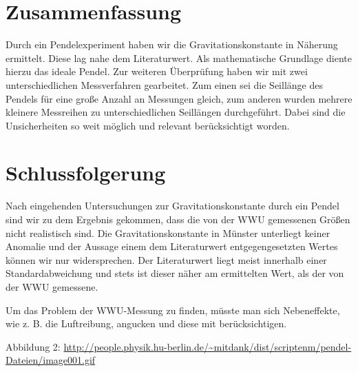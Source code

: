 \documentclass[11pt,a4paper,titlepage, ngerman]{article}
\begin{document}
	\section{Zusammenfassung}
		Durch ein Pendelexperiment haben wir die Gravitationskonstante in Näherung ermittelt.
		Diese lag nahe dem Literaturwert.
		Als mathematische Grundlage diente hierzu das ideale Pendel.
		Zur weiteren Überprüfung haben wir mit zwei unterschiedlichen Messverfahren gearbeitet.
		Zum einen sei die Seillänge des Pendels für eine große Anzahl an Messungen gleich, zum anderen wurden mehrere kleinere Messreihen zu unterschiedlichen Seillängen durchgeführt.
		Dabei sind die Unsicherheiten so weit möglich und relevant berücksichtigt worden.
		
		
	\section{Schlussfolgerung}
		Nach eingehenden Untersuchungen zur Gravitationskonstante durch ein Pendel sind wir zu dem Ergebnis gekommen, dass die von der WWU gemessenen Größen nicht realistisch sind.
		Die Gravitationskonstante in Münster unterliegt keiner Anomalie und der Aussage einem dem Literaturwert entgegengesetzten Wertes können wir nur widersprechen.
		Der Literaturwert liegt meist innerhalb einer Standardabweichung und stets ist dieser näher am ermittelten Wert, als der von der WWU gemessene.
		
		Um das Problem der WWU-Messung zu finden, müsste man sich Nebeneffekte, wie z. B. die Luftreibung, angucken und diese mit berücksichtigen.
		
		
		\newpage
		
		\begin{thebibliography}{9}		
			\item[Abbildung 2:] \url{http://people.physik.hu-berlin.de/~mitdank/dist/scriptenm/pendel-Dateien/image001.gif}			
		\end{thebibliography}	
			
\end{document}
